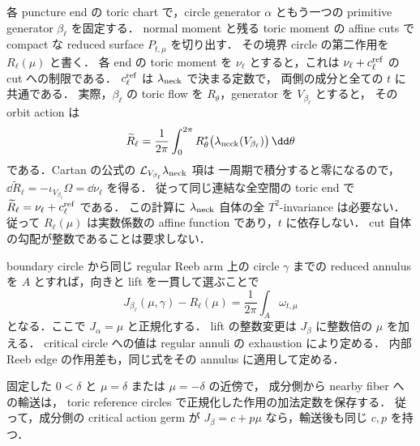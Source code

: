 各 puncture end の toric chart で，circle generator $\alpha$ ともう一つの
primitive generator $\beta_\ell$ を固定する．
normal moment と残る toric moment の affine cuts で
compact な reduced surface $P_{t,\mu}$ を切り出す．
その境界 circle の第二作用を $R_\ell(\mu)$ と書く．
各 end の toric moment を $\nu_\ell$ とすると，これは
$\nu_\ell+c_\ell^{\rm ref}$ の cut への制限である．
$c_\ell^{\rm ref}$ は $\lambda_{\rm neck}$ で決まる定数で，
両側の成分と全ての $t$ に共通である．
実際，$\beta_\ell$ の toric flow を $R_\theta$，generator を $V_{\beta_\ell}$ とすると，
その orbit action は
\[
 \widetilde R_\ell=
 \frac1{2\pi}\int_0^{2\pi}R_\theta^*
       \bigl(\lambda_{\rm neck}(V_{\beta_\ell})\bigr)\,\dd\theta
\]
である．Cartan の公式の $\mathcal L_{V_{\beta_\ell}}\lambda_{\rm neck}$ 項は
一周期で積分すると零になるので，
$\dd\widetilde R_\ell=-\iota_{V_{\beta_\ell}}\Omega=\dd\nu_\ell$ を得る．
従って同じ連結な全空間の toric end で
$\widetilde R_\ell=\nu_\ell+c_\ell^{\rm ref}$ である．
この計算に $\lambda_{\rm neck}$ 自体の全 $T^2$-invariance は必要ない．
従って $R_\ell(\mu)$ は実数係数の affine function であり，$t$ に依存しない．
cut 自体の勾配が整数であることは要求しない．

boundary circle から同じ regular Reeb arm 上の circle $\gamma$ までの
reduced annulus を $A$ とすれば，向きと lift を一貫して選ぶことで
\begin{equation}\label{ng8:relative-action}
 J_{\beta_\ell}(\mu,\gamma)-R_\ell(\mu)
 =\frac1{2\pi}\int_A\omega_{t,\mu}
\end{equation}
となる．ここで $J_\alpha=\mu$ と正規化する．
lift の整数変更は $J_\beta$ に整数倍の $\mu$ を加える．
critical circle への値は regular annuli の exhaustion により定める．
内部 Reeb edge の作用差も，同じ式をその annulus に適用して定める．

\begin{lemma}[切断面における作用の加法定数の保存]
\label{ng8:transport-intercept}
固定した $0<\delta$ と $\mu=\delta$ または $\mu=-\delta$ の近傍で，
成分側から nearby fiber への輸送は，
toric reference circles で正規化した作用の加法定数を保存する．
従って，成分側の critical action germ が
$J_\beta=c+p\mu$ なら，輸送後も同じ $c,p$ を持つ．
\end{lemma}

